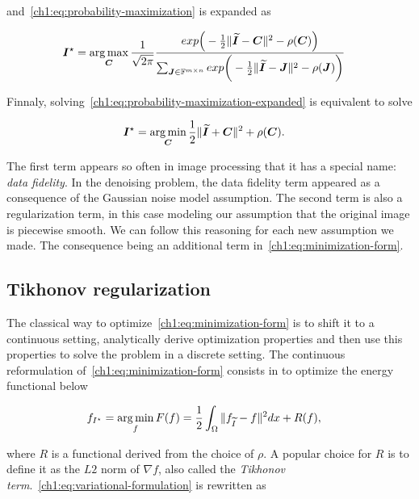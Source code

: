 and~\cref{ch1:eq:probability-maximization} is expanded as

\begin{align}
	\bm{I}^{\star} & = \operatorname*{arg\,max} _{\bm{C}} \frac{1}{\sqrt{2\pi}} \frac{exp\Big(- \frac{1}{2}\lVert\bm{\widetilde{I}} - \bm{C}\rVert^2 - \rho(\bm{C}) \Big) }{ \sum_{\bm{J} \in \mathbb{F}^{m \times n}}{exp\bigg(-\frac{1}{2}\lVert\widetilde{\bm{I}}-\bm{J}\rVert^2 - \rho(\bm{J})}\bigg) }
	\label{ch1:eq:probability-maximization-expanded}
\end{align}

Finnaly, solving~\cref{ch1:eq:probability-maximization-expanded} is equivalent to solve

\begin{align}
	\bm{I}^{\star} &= \operatorname*{arg\,min} _{\bm{C}} \frac{1}{2}\lVert\bm{\widetilde{I}} + \bm{C}\rVert^2 + \rho(\bm{C}).
	\label{ch1:eq:minimization-form}
\end{align}

The first term appears so often in image processing that it has a special name: \emph{data fidelity}. In the denoising problem, the data fidelity term appeared as a consequence of the Gaussian noise model assumption. The second term is also a regularization term, in this case modeling our assumption that the original image is piecewise smooth. We can follow this reasoning for each new assumption we made. The consequence being an additional term in~\cref{ch1:eq:minimization-form}.

\subsection{Tikhonov regularization}

The classical way to optimize~\cref{ch1:eq:minimization-form} is to shift it to a continuous setting, analytically derive optimization properties and then use this properties to solve the problem in a discrete setting. The continuous reformulation of~\cref{ch1:eq:minimization-form} consists in to optimize the energy functional below

\begin{align}
	f_{I^{\star}} &= \operatorname*{arg\,min}_{f} F(f) = \frac{1}{2} \int_{\Omega}{ \lVert f_{\widetilde{I}} - f\rVert^2dx} + R(f),
	\label{ch1:eq:variational-formulation}
\end{align}

where $R$ is a functional derived from the choice of $\rho$. A popular choice for $R$ is to define it as the $L2$ norm of $\nabla f$, also called the \emph{Tikhonov term}.~\cref{ch1:eq:variational-formulation} is rewritten as

